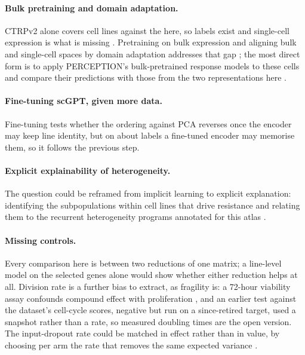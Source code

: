 \paragraph{Bulk pretraining and domain adaptation.} CTRPv2 alone covers \NCtrpLines{} cell lines
against the \NLines{} here, so labels exist and single-cell expression is what is missing
\cite{ctrpv2,scdeal}. Pretraining on bulk expression and aligning bulk and single-cell spaces by domain
adaptation addresses that gap \cite{scdeal,ganin2015}; the most direct form is to apply PERCEPTION's
bulk-pretrained response models to these cells and compare their predictions with those from the two
representations here \cite{perception}.

\paragraph{Fine-tuning scGPT, given more data.} Fine-tuning tests whether the ordering against PCA
reverses once the encoder may keep line identity, but on about \NLinesCV{} labels a fine-tuned encoder
may memorise them, so it follows the previous step.

\paragraph{Explicit explainability of heterogeneity.} The question could be reframed from implicit
learning to explicit explanation: identifying the subpopulations within cell lines that drive resistance
and relating them to the recurrent heterogeneity programs annotated for this atlas \cite{scp542}.

\paragraph{Missing controls.} Every comparison here is between two reductions of one matrix; a
line-level model on the \NHvg{} selected genes alone would show whether either reduction helps at all. Division rate is a further bias to extract, as fragility is: a 72-hour viability assay
confounds compound effect with proliferation \cite{hafner}, and an earlier test against the dataset's
cell-cycle scores, negative but run on a since-retired target, used a snapshot rather than a rate, so
measured doubling times are the open version. The input-dropout rate could be matched in effect rather
than in value, by choosing per arm the rate that removes the same expected variance
\cite{srivastava2014}.

